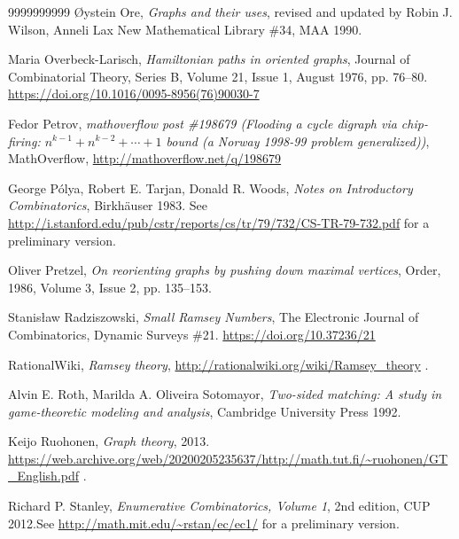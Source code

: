\documentclass[numbers=enddot,12pt,final,onecolumn,notitlepage]{scrartcl}%
\theoremstyle{definition}
\begin{document}
\begin{thebibliography}{9999999999}
\O ystein Ore, \textit{Graphs and their uses}, revised and updated by
Robin J. Wilson,
Anneli Lax New Mathematical Library \#34, MAA 1990.

Maria Overbeck-Larisch,
\textit{Hamiltonian paths in oriented graphs},
Journal of Combinatorial Theory, Series B,
Volume 21, Issue 1, August 1976, pp. 76--80.
\newline \url{https://doi.org/10.1016/0095-8956(76)90030-7}

Fedor Petrov,
\textit{mathoverflow post \#198679 (Flooding a cycle digraph via
chip-firing: $n^{k-1} + n^{k-2} + \cdots + 1$ bound (a Norway 1998-99
problem generalized))},
MathOverflow,
\newline \url{http://mathoverflow.net/q/198679}

George P\'olya, Robert E. Tarjan,
Donald R. Woods,
\textit{Notes on Introductory Combinatorics},
Birkh\"auser 1983.
\newline See
\url{http://i.stanford.edu/pub/cstr/reports/cs/tr/79/732/CS-TR-79-732.pdf}
for a preliminary version.

Oliver Pretzel,
\textit{On reorienting graphs by pushing down maximal vertices},
Order, 1986, Volume 3, Issue 2, pp. 135--153.

Stanis\l aw Radziszowski,
\textit{Small Ramsey Numbers},
The Electronic Journal of Combinatorics,
Dynamic Surveys \#21. \newline
\url{https://doi.org/10.37236/21}

RationalWiki,
\textit{Ramsey theory},
\url{http://rationalwiki.org/wiki/Ramsey_theory} .

Alvin E. Roth, Marilda A. Oliveira
Sotomayor, \textit{Two-sided matching: A study in game-theoretic
modeling and analysis}, Cambridge University Press 1992.

Keijo Ruohonen, \textit{Graph theory},
2013.\newline
\url{https://web.archive.org/web/20200205235637/http://math.tut.fi/~ruohonen/GT_English.pdf} .

Richard P. Stanley, \textit{Enumerative
Combinatorics, Volume 1}, 2nd edition, CUP 2012.\newline See
\url{http://math.mit.edu/~rstan/ec/ec1/} for a preliminary version.


\end{thebibliography}
\end{document}
